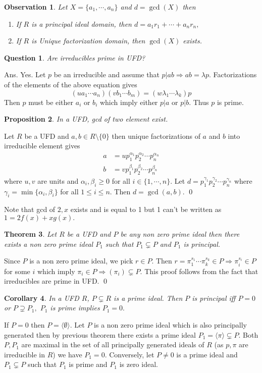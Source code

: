 \documentclass[11pt]{amsart}
\newtheorem{theorem}{Theorem}[section]
\newtheorem*{qns*}{Question}
\newtheorem{obs}[theorem]{Observation}
\newtheorem{proposition}[theorem]{Proposition}%
\newtheorem{corollary}[theorem]{Corollary}%
\newcommand{\gen}[1]{\langle#1\rangle}
\begin{document}
\begin{obs}
Let $X=\{a_1,\cdots ,a_n\}$ and $d=\gcd (X)$ then \begin{enumerate}
\item If $R$ is a principal ideal domain, then $d=a_1r_1+\cdots +a_nr_n,$
\item If $R$ is Unique factorization domain, then $\gcd (X)$ exists.
\end{enumerate}
\end{obs}
\begin{qns*}
Are irreducibles prime in UFD?
\end{qns*}
Ans. Yes. Let $p$ be an irreducible and assume that $p|ab \Rightarrow ab=\lambda p$. Factorizations of the elements of the above equation gives $$(ua_1\cdots a_n)(vb_1\cdots b_m)=(w\lambda_1\cdots \lambda_k)p$$ Then $p$ must be either $a_i$ or $b_i$ which imply either $p|a$ or $p|b$. Thus $p$ is prime.
\begin{proposition}
In a UFD, gcd of two element exist.
\end{proposition}
\proof Let $R$ be a UFD and $a,b\in R\setminus \{0\}$ then unique factorizations of $a$ and $b$ into irreducible element gives \begin{align*}
a&=up_1^{\alpha_1}p_2^{\alpha_2}\cdots p_n^{\alpha_n}\\
b&=vp_1^{\beta_1}p_2^{\beta_2}\cdots p_n^{\beta_n}
\end{align*}
where $u,v$ are units and $\alpha_i,\beta_i\geq 0$ for all $i\in \{1,\cdots ,n\}.$ Let $d=p_1^{\gamma_1}p_2^{\gamma_2}\cdots p_n^{\gamma_n}$ where $\gamma_i=\min \{\alpha_i,\beta_i\}$ for all $1\leq i\leq n.$ Then $d=\gcd (a,b).$ \qed

Note that gcd of $2,x$ exists and is equal to 1 but 1 can't be written as $1=2f(x)+xg(x).$

\begin{theorem}
Let $R$ be a UFD and $P$ be any non zero prime ideal then there exists a non zero prime ideal $P_1$ such that $P_1\subsetneq P$ and $P_1$ is principal.
\end{theorem}
\proof Since $P$ is a non zero prime ideal, we pick $r\in P.$ Then $r=\pi_1^{s_1}\cdots \pi_k^{s_k}\in P \Rightarrow \pi_i^{s_i}\in P$ for some $i$ which imply $\pi_i\in P \Rightarrow (\pi_i)\subsetneq P$. This proof follows from the fact that irreducibles are prime in UFD. \qed

\begin{corollary}
In a UFD $R$, $P\subsetneq R$ is a prime ideal. Then $P$ is principal iff $P=0$ or $P\supsetneq P_1,$ $P_1$ is prime implies $P_1=0.$
\end{corollary}
\proof If $P=0$ then $P=\gen{\emptyset}.$ Let $P$ is a non zero prime ideal which is also principally generated then by previous theorem there exists a prime ideal $P_1=\gen{\pi}\subsetneq P$. Both $P,P_1$ are maximal in the set of all principally generated ideals of $R$ (as $p,\pi$ are irreducible in $R$) we have $P_1=0.$ Conversely, let $P\neq 0$ is a prime ideal and $P_1\subsetneq P$ such that $P_1$ is prime and $P_1$ is zero ideal.
\end{document}
